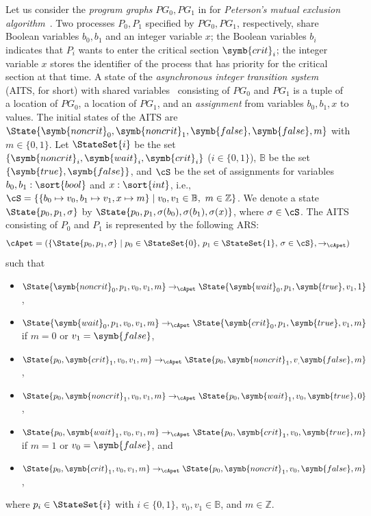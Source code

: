 \begin{example}\label{example:peterson-ec}
	Let us consider the \emph{program graphs} $\mathit{PG}_0, \mathit{PG}_1$ in  for \emph{Peterson's mutual exclusion algorithm}~\cite[Example~2.25]{BK08}.
	Two processes $P_0,P_1$ specified by $\mathit{PG}_0, \mathit{PG}_1$, respectively, share Boolean variables $b_0,b_1$ and an integer variable $x$;
	the Boolean variables $b_i$ indicates that $P_i$ wants to enter the critical section $\symb{crit}_i$;
	the integer variable $x$ stores the identifier of the process that has priority for the critical section at that time.
	A state of the \emph{asynchronous integer transition system} (AITS, for short) with shared variables~\cite{BK08} consisting of $\mathit{PG}_0$ and $\mathit{PG}_1$ is
	a tuple of a location of $\mathit{PG}_0$, a location of $\mathit{PG}_1$, and an \emph{assignment} from variables $b_0,b_1,x$ to values.
	The initial states of the AITS are
	$\State{\symb{noncrit}_0,\symb{noncrit}_1,\symb{false},\symb{false},m}$ with $m\in\{0,1\}$.
	Let $\StateSet{i}$ be the set $\{\symb{noncrit}_i,\symb{wait}_i,\symb{crit}_i\}$ ($i\in\{0,1\}$), $\mathbb{B}$ be the set $\{\symb{true},\symb{false}\}$, and $\cS$ be the set of assignments for variables $b_0,b_1:\sort{bool}$ and $x:\sort{int}$, i.e.,
	$\cS = \{ \{b_0\mapsto v_0, b_1 \mapsto v_1, x \mapsto m \} \mid v_0,v_1 \in \mathbb{B}, ~ m \in \mathbb{Z} \}$.
	We denote a state $\State{p_0,p_1,\sigma}$ by $\State{p_0,p_1,\sigma(b_0),\sigma(b_1),\sigma(x)}$, where $\sigma \in \cS$.
	The AITS consisting of $P_0$ and $P_1$ is represented by the following ARS:
	\[
		\cApet =
		(\{ \State{p_0,p_1,\sigma} \mid p_0 \in \StateSet{0}, \, p_1 \in \StateSet{1}, \, \sigma \in \cS \},
		\to_{\cApet})
	\]
	such that
	\begin{itemize}
		\item $\State{\symb{noncrit}_0,p_1,v_0,v_1,m} \to_{\cApet} \State{\symb{wait}_0,p_1,\symb{true},v_1,1}$,
		\item $\State{\symb{wait}_0,p_1,v_0,v_1,m} \to_{\cApet} \State{\symb{crit}_0,p_1,\symb{true},v_1,m}$
		      if $m=0$ or $v_1 = \symb{false}$,
		\item $\State{p_0,\symb{crit}_1,v_0,v_1,m} \to_{\cApet} \State{p_0,\symb{noncrit}_1,v_,\symb{false},m}$,
		\item $\State{p_0,\symb{noncrit}_1,v_0,v_1,m} \to_{\cApet} \State{p_0,\symb{wait}_1,v_0,\symb{true},0}$,
		\item $\State{p_0,\symb{wait}_1,v_0,v_1,m} \to_{\cApet} \State{p_0,\symb{crit}_1,v_0,\symb{true},m}$
		      if $m=1$ or $v_0 = \symb{false}$,
		      and
		\item $\State{p_0,\symb{crit}_1,v_0,v_1,m} \to_{\cApet} \State{p_0,\symb{noncrit}_1,v_0,\symb{false},m}$,
	\end{itemize}
	where
	$p_i \in \StateSet{i}$ with $i\in\{0,1\}$,
	$v_0,v_1 \in \mathbb{B}$,
	and
	$m \in \mathbb{Z}$.


\end{example}
